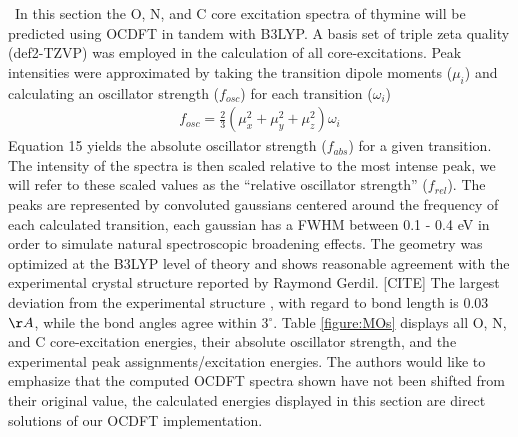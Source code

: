 \documentclass[12pt]{article}
\begin{document}
  \ In this section the O, N, and C core excitation spectra of thymine will be predicted using OCDFT in tandem with B3LYP.  A basis set of triple zeta quality (def2-TZVP) was employed in the calculation of all core-excitations. Peak intensities were approximated by taking the transition dipole moments ($\mu_i$) and calculating an oscillator strength ($f_{osc} $) for each transition ($\omega_{i}$)
  \begin{align}
  f_{osc} = \frac{2}{3} (\mu_x^2 + \mu_y^2 + \mu_z^2) \omega_{i}
  \end{align}
Equation 15 yields the absolute oscillator strength ($f_{abs}$) for a given transition. The intensity of the spectra is then scaled relative to the most intense peak, we will refer to these scaled values as the ``relative oscillator strength'' ($f_{rel}$). The peaks are represented by convoluted gaussians centered around the frequency of each calculated transition, each gaussian has a FWHM between 0.1 - 0.4 eV in order to simulate natural spectroscopic broadening effects.  The geometry was optimized at the B3LYP level of theory and shows reasonable agreement with the experimental crystal structure reported by Raymond Gerdil. [CITE] The largest deviation from the experimental structure , with regard to bond length is 0.03 $\AA$, while the bond angles agree within 3$^{\circ}$. Table \ref{figure:MOs} displays all O, N, and C core-excitation energies, their absolute oscillator strength, and the experimental peak assignments/excitation energies. The authors would like to emphasize that the computed OCDFT spectra shown have not been shifted from their original value, the calculated energies displayed in this section are direct solutions of our OCDFT implementation. \\
\end{document}
